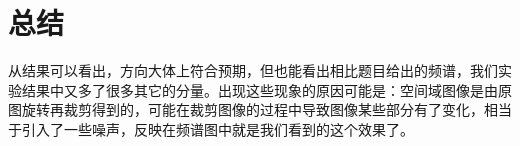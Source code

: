 \documentclass[UTF8]{ctexart}
\begin{document}
            


	\section{总结}
		\indent 从结果可以看出，方向大体上符合预期，但也能看出相比题目给出的频谱，我们实验结果中又多了很多其它的分量。出现这些现象的原因可能是：空间域图像是由原图旋转再裁剪得到的，可能在裁剪图像的过程中导致图像某些部分有了变化，相当于引入了一些噪声，反映在频谱图中就是我们看到的这个效果了。
		
		

		
	
	
%
%

\end{document}
